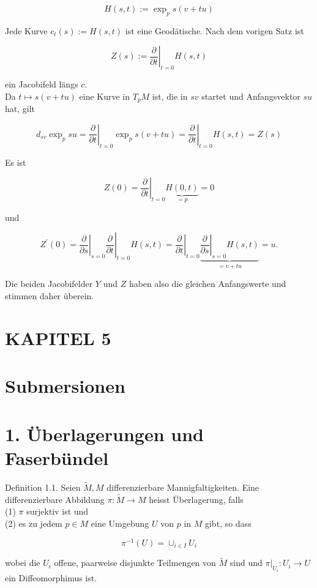 \documentclass[10pt]{article}
\begin{document}
$$
H(s, t):=\exp _{p} s(v+t u)
$$

Jede Kurve $c_{t}(s):=H(s, t)$ ist eine Geodätische. Nach dem vorigen Satz ist

$$
Z(s):=\left.\frac{\partial}{\partial t}\right|_{t=0} H(s, t)
$$

ein Jacobifeld längs $c$.\\
Da $t \mapsto s(v+t u)$ eine Kurve in $T_{p} M$ ist, die in $s v$ startet und Anfangsvektor $s u$ hat, gilt

$$
d_{s v} \exp _{p} s u=\left.\frac{\partial}{\partial t}\right|_{t=0} \exp _{p} s(v+t u)=\left.\frac{\partial}{\partial t}\right|_{t=0} H(s, t)=Z(s)
$$

Es ist

$$
Z(0)=\left.\frac{\partial}{\partial t}\right|_{t=0} \underbrace{H(0, t)}_{=p}=0
$$

und

$$
Z^{\prime}(0)=\left.\left.\frac{\partial}{\partial s}\right|_{s=0} \frac{\partial}{\partial t}\right|_{t=0} H(s, t)=\left.\frac{\partial}{\partial t}\right|_{t=0} \underbrace{\left.\frac{\partial}{\partial s}\right|_{s=0} H(s, t)}_{=v+t u}=u .
$$

Die beiden Jacobifelder $Y$ und $Z$ haben also die gleichen Anfangswerte und stimmen daher überein.

\section*{KAPITEL 5}
\section*{Submersionen}
\section*{1. Überlagerungen und Faserbündel}
Definition 1.1. Seien $\tilde{M}, M$ differenzierbare Mannigfaltigkeiten. Eine differenzierbare Abbildung $\pi: \tilde{M} \rightarrow M$ heisst Überlagerung, falls\\
(1) $\pi$ surjektiv ist und\\
(2) es zu jedem $p \in M$ eine Umgebung $U$ von $p$ in $M$ gibt, so dass

$$
\pi^{-1}(U)=\cup_{i \in I} U_{i}
$$

wobei die $U_{i}$ offene, paarweise disjunkte Teilmengen von $\tilde{M}$ sind und $\left.\pi\right|_{U_{i}}: U_{i} \rightarrow U$ ein Diffeomorphimus ist.
\end{document}
